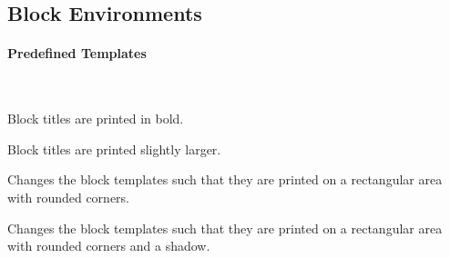   


  





\subsection{Block Environments}

\paragraph{Predefined Templates}\

\begin{command}{\beamertemplateboldblocks}
  Block titles are printed in bold.
\end{command}

\begin{command}{\beamertemplatelargeblocks}
  Block titles are printed slightly larger.
\end{command}

\begin{command}{\beamertemplateroundedblocks}
  Changes the block templates such that they are printed on a
  rectangular area with rounded corners.
\end{command}

\begin{command}{\beamertemplateshadowblocks}
  Changes the block templates such that they are printed on a
  rectangular area with rounded corners and a shadow.
\end{command}



